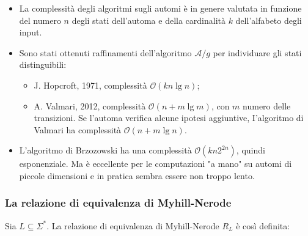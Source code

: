\begin{itemize}
    \item La complessità degli algoritmi sugli automi è in genere valutata in funzione del numero $n$ degli stati dell'automa e della cardinalità $k$ dell'alfabeto degli input.
    \item Sono stati ottenuti raffinamenti dell'algoritmo $\mathcal{A} / g$ per individuare gli stati distinguibili:
    \begin{itemize}
        \item J. Hopcroft, 1971, complessità $\mathcal{O}(k n \lg n)$;
        \item A. Valmari, 2012, complessità $\mathcal{O}(n+m \lg m)$, con $m$ numero delle transizioni. Se l'automa verifica alcune ipotesi aggiuntive, I'algoritmo di Valmari ha complessità $\mathcal{O}(n+m \lg n)$.
    \end{itemize}
    \item L'algoritmo di Brzozowski ha una complessità $\mathcal{O}\left(k n 2^{2 n}\right)$, quindi esponenziale. Ma è eccellente per le computazioni "a mano" su automi di piccole dimensioni e in pratica sembra essere non troppo lento.
\end{itemize}

\subsubsection{La relazione di equivalenza di Myhill-Nerode}

Sia $L \subseteq \Sigma^{*}$. La relazione di equivalenza di Myhill-Nerode $R_{L}$ è così definita:

